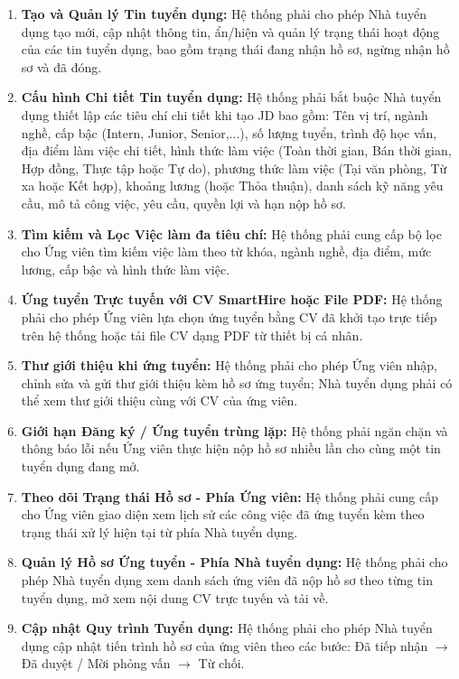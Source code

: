 \begin{enumerate}[label=\bfseries REQ-REC-\arabic*:, labelwidth=!, labelsep=0.5em, leftmargin=3.0cm]
    \item \textbf{Tạo và Quản lý Tin tuyển dụng:} Hệ thống phải cho phép Nhà tuyển dụng tạo mới, cập nhật thông tin, ẩn/hiện và quản lý trạng thái hoạt động của các tin tuyển dụng, bao gồm trạng thái đang nhận hồ sơ, ngừng nhận hồ sơ và đã đóng.
    \item \textbf{Cấu hình Chi tiết Tin tuyển dụng:} Hệ thống phải bắt buộc Nhà tuyển dụng thiết lập các tiêu chí chi tiết khi tạo JD bao gồm: Tên vị trí, ngành nghề, cấp bậc (Intern, Junior, Senior,...), số lượng tuyển, trình độ học vấn, địa điểm làm việc chi tiết, hình thức làm việc (Toàn thời gian, Bán thời gian, Hợp đồng, Thực tập hoặc Tự do), phương thức làm việc (Tại văn phòng, Từ xa hoặc Kết hợp), khoảng lương (hoặc Thỏa thuận), danh sách kỹ năng yêu cầu, mô tả công việc, yêu cầu, quyền lợi và hạn nộp hồ sơ.
    \item \textbf{Tìm kiếm và Lọc Việc làm đa tiêu chí:} Hệ thống phải cung cấp bộ lọc cho Ứng viên tìm kiếm việc làm theo từ khóa, ngành nghề, địa điểm, mức lương, cấp bậc và hình thức làm việc.
    \item \textbf{Ứng tuyển Trực tuyến với CV SmartHire hoặc File PDF:} Hệ thống phải cho phép Ứng viên lựa chọn ứng tuyển bằng CV đã khởi tạo trực tiếp trên hệ thống hoặc tải file CV dạng PDF từ thiết bị cá nhân.
    \item \textbf{Thư giới thiệu khi ứng tuyển:} Hệ thống phải cho phép Ứng viên nhập, chỉnh sửa và gửi thư giới thiệu kèm hồ sơ ứng tuyển; Nhà tuyển dụng phải có thể xem thư giới thiệu cùng với CV của ứng viên.
    \item \textbf{Giới hạn Đăng ký / Ứng tuyển trùng lặp:} Hệ thống phải ngăn chặn và thông báo lỗi nếu Ứng viên thực hiện nộp hồ sơ nhiều lần cho cùng một tin tuyển dụng đang mở.
    \item \textbf{Theo dõi Trạng thái Hồ sơ - Phía Ứng viên:} Hệ thống phải cung cấp cho Ứng viên giao diện xem lịch sử các công việc đã ứng tuyển kèm theo trạng thái xử lý hiện tại từ phía Nhà tuyển dụng.
    \item \textbf{Quản lý Hồ sơ Ứng tuyển - Phía Nhà tuyển dụng:} Hệ thống phải cho phép Nhà tuyển dụng xem danh sách ứng viên đã nộp hồ sơ theo từng tin tuyển dụng, mở xem nội dung CV trực tuyến và tải về.
    \item \textbf{Cập nhật Quy trình Tuyển dụng:} Hệ thống phải cho phép Nhà tuyển dụng cập nhật tiến trình hồ sơ của ứng viên theo các bước: Đã tiếp nhận $\rightarrow$ Đã duyệt / Mời phỏng vấn $\rightarrow$ Từ chối.

\end{enumerate}
